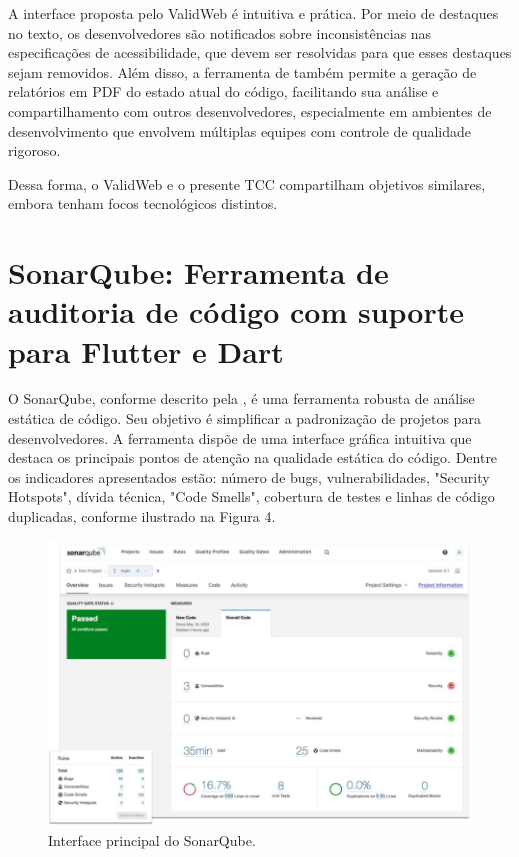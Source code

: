 A interface proposta pelo ValidWeb é intuitiva e prática. Por meio de destaques no texto, os desenvolvedores são notificados sobre inconsistências nas especificações de acessibilidade, que devem ser resolvidas para que esses destaques sejam removidos. Além disso, a ferramenta de \cite{validaweb} também permite a geração de relatórios em PDF do estado atual do código, facilitando sua análise e compartilhamento com outros desenvolvedores, especialmente em ambientes de desenvolvimento que envolvem múltiplas equipes com controle de qualidade rigoroso.

Dessa forma, o ValidWeb e o presente TCC compartilham objetivos similares, embora tenham focos tecnológicos distintos.

\section{SonarQube: Ferramenta de auditoria de código com suporte para Flutter e Dart}

O SonarQube, conforme descrito pela \cite{sonarqube}, é uma ferramenta robusta de análise estática de código. Seu objetivo é simplificar a padronização de projetos para desenvolvedores. A ferramenta dispõe de uma interface gráfica intuitiva que destaca os principais pontos de atenção na qualidade estática do código. Dentre os indicadores apresentados estão: número de bugs, vulnerabilidades, "Security Hotspots", dívida técnica, "Code Smells", cobertura de testes e linhas de código duplicadas, conforme ilustrado na Figura 4.

\begin{figure}[!h]
	\centering
	\caption{Interface principal do SonarQube.}
	\includegraphics[width=432pt]{Assets/SonarQube.png}
\end{figure}

